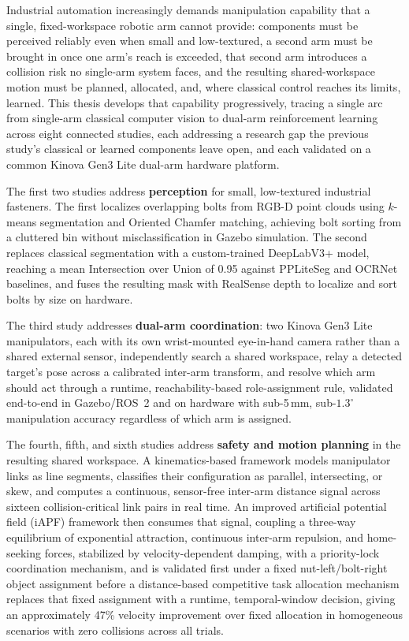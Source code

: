 \begin{Abstract}
Industrial automation increasingly demands manipulation capability that a single, fixed-workspace
robotic arm cannot provide: components must be perceived reliably even when small and
low-textured, a second arm must be brought in once one arm's reach is exceeded, that second arm
introduces a collision risk no single-arm system faces, and the resulting shared-workspace motion
must be planned, allocated, and, where classical control reaches its limits, learned. This thesis
develops that capability progressively, tracing a single arc from single-arm classical computer
vision to dual-arm reinforcement learning across eight connected studies, each addressing a
research gap the previous study's classical or learned components leave open, and each validated on
a common Kinova Gen3 Lite dual-arm hardware platform.

The first two studies address \textbf{perception} for small, low-textured industrial fasteners.
The first localizes overlapping bolts from RGB-D point clouds using $k$-means segmentation and
Oriented Chamfer matching, achieving bolt sorting from a cluttered bin without misclassification in
Gazebo simulation. The second replaces classical segmentation with a custom-trained DeepLabV3+
model, reaching a mean Intersection over Union of 0.95 against PPLiteSeg and OCRNet baselines, and
fuses the resulting mask with RealSense depth to localize and sort bolts by size on hardware.

The third study addresses \textbf{dual-arm coordination}: two Kinova Gen3 Lite manipulators, each
with its own wrist-mounted eye-in-hand camera rather than a shared external sensor, independently
search a shared workspace, relay a detected target's pose across a calibrated inter-arm transform,
and resolve which arm should act through a runtime, reachability-based role-assignment rule,
validated end-to-end in Gazebo/ROS~2 and on hardware with sub-5\,mm, sub-$1.3^\circ$ manipulation
accuracy regardless of which arm is assigned.

The fourth, fifth, and sixth studies address \textbf{safety and motion planning} in the resulting
shared workspace. A kinematics-based framework models manipulator links as line segments,
classifies their configuration as parallel, intersecting, or skew, and computes a continuous,
sensor-free inter-arm distance signal across sixteen collision-critical link pairs in real time.
An improved artificial potential field (iAPF) framework then consumes that signal, coupling a
three-way equilibrium of exponential attraction, continuous inter-arm repulsion, and home-seeking
forces, stabilized by velocity-dependent damping, with a priority-lock coordination mechanism,
and is validated first under a fixed nut-left/bolt-right
object assignment before a distance-based competitive task allocation mechanism replaces that fixed
assignment with a runtime, temporal-window decision, giving an approximately 47\% velocity
improvement over fixed allocation in homogeneous scenarios with zero collisions across all trials.


\end{Abstract}
